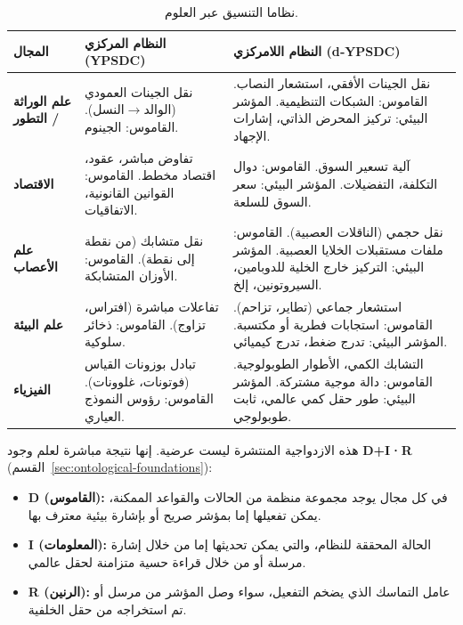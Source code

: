 \documentclass[11pt,a4paper]{article}
\begin{document}
	\begin{table}[htbp]
		\centering
		\caption{نظاما التنسيق عبر العلوم.}
		\label{tab:two-regimes-sciences}
		\begin{english}
			\begin{tabular}{p{3.0cm}p{5.5cm}p{6.5cm}}
				\toprule
				\textbf{المجال} & \textbf{النظام المركزي (YPSDC)} & \textbf{النظام اللامركزي (d‑YPSDC)} \\
				\midrule
				\textbf{علم الوراثة / التطور} &
				نقل الجينات العمودي (الوالد$\to$النسل). القاموس: الجينوم. &
				نقل الجينات الأفقي، استشعار النصاب. القاموس: الشبكات التنظيمية. المؤشر البيئي: تركيز المحرض الذاتي، إشارات الإجهاد. \\
				\midrule
				\textbf{الاقتصاد} &
				تفاوض مباشر، عقود، اقتصاد مخطط. القاموس: القوانين القانونية، الاتفاقيات. &
				آلية تسعير السوق. القاموس: دوال التكلفة، التفضيلات. المؤشر البيئي: سعر السوق للسلعة. \\
				\midrule
				\textbf{علم الأعصاب} &
				نقل متشابك (من نقطة إلى نقطة). القاموس: الأوزان المتشابكة. &
				نقل حجمي (الناقلات العصبية). القاموس: ملفات مستقبلات الخلايا العصبية. المؤشر البيئي: التركيز خارج الخلية للدوبامين، السيروتونين، إلخ. \\
				\midrule
				\textbf{علم البيئة} &
				تفاعلات مباشرة (افتراس، تزاوج). القاموس: ذخائر سلوكية. &
				استشعار جماعي (تطاير، تزاحم). القاموس: استجابات فطرية أو مكتسبة. المؤشر البيئي: تدرج ضغط، تدرج كيميائي. \\
				\midrule
				\textbf{الفيزياء} &
				تبادل بوزونات القياس (فوتونات، غلوونات). القاموس: رؤوس النموذج العياري. &
				التشابك الكمي، الأطوار الطوبولوجية. القاموس: دالة موجية مشتركة. المؤشر البيئي: طور حقل كمي عالمي، ثابت طوبولوجي. \\
				\bottomrule
			\end{tabular}
		\end{english}
	\end{table}
	
	\medskip
	\noindent
	هذه الازدواجية المنتشرة ليست عرضية. إنها نتيجة مباشرة لعلم وجود \textbf{D+I·R} (القسم~\ref{sec:ontological-foundations}):
	\begin{itemize}[leftmargin=*]
		\item \textbf{D (القاموس):} في كل مجال يوجد مجموعة منظمة من الحالات والقواعد الممكنة، يمكن تفعيلها إما بمؤشر صريح أو بإشارة بيئية معترف بها.
		\item \textbf{I (المعلومات):} الحالة المحققة للنظام، والتي يمكن تحديثها إما من خلال إشارة مرسلة أو من خلال قراءة حسية متزامنة لحقل عالمي.
		\item \textbf{R (الرنين):} عامل التماسك الذي يضخم التفعيل، سواء وصل المؤشر من مرسل أو تم استخراجه من حقل الخلفية.
	\end{itemize}
	
\end{document}
